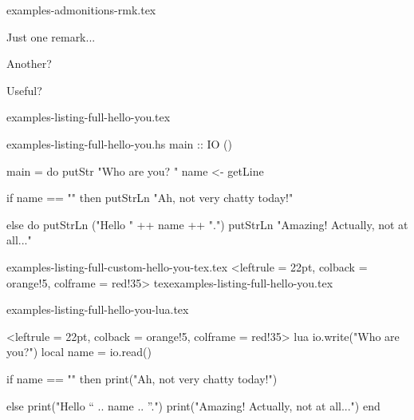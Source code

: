 \begin{filecontents*}[overwrite]{examples-admonitions-rmk.tex}
\begin{tdocrem}
    Just one remark...
\end{tdocrem}

\begin{tdocrem}
    Another?
\end{tdocrem}

\begin{tdocrem}
    Useful?
\end{tdocrem}
\end{filecontents*}


\begin{filecontents*}[overwrite]{examples-listing-full-hello-you.tex}
\end{filecontents*}


\begin{filecontents*}[overwrite]{examples-listing-full-hello-you.hs}
main :: IO ()

main = do
    putStr "Who are you? "
    name <- getLine

    if name == ""
        then putStrLn "Ah, not very chatty today!"

    else do
        putStrLn ("Hello " ++ name ++ ".")
        putStrLn "Amazing! Actually, not at all..."
\end{filecontents*}


\begin{filecontents*}[overwrite]{examples-listing-full-custom-hello-you-tex.tex}
\tdoccodeinput[style = solarized-light, linenos]%
              <leftrule = 22pt, colback = orange!5, colframe = red!35>%
              {tex}{examples-listing-full-hello-you.tex}
\end{filecontents*}


\begin{filecontents*}[overwrite]{examples-listing-full-hello-you-lua.tex}
\begin{tdoccode}[style = solarized-light, linenos]%
                <leftrule = 22pt, colback = orange!5, colframe = red!35>%
                {lua}
io.write("Who are you?")
local name = io.read()

if name == "" then
    print("Ah, not very chatty today!")

else
    print("Hello “ .. name .. ”.")
    print("Amazing! Actually, not at all...")
end
\end{tdoccode}
\end{filecontents*}


